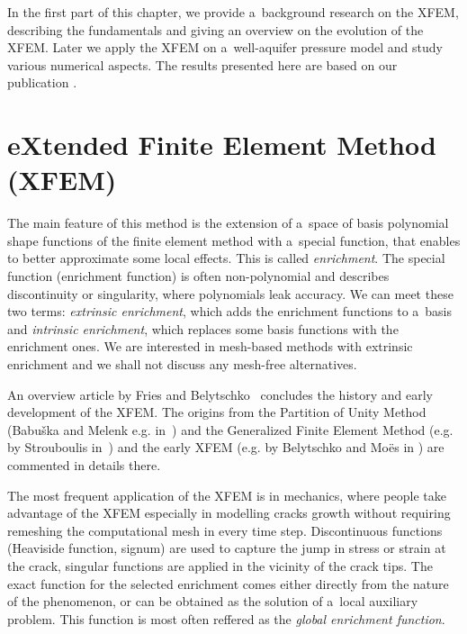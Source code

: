 

In the first part of this chapter, we provide a~background research on the XFEM,
describing the fundamentals and giving an overview on the evolution of the XFEM.
Later we apply the XFEM on a~well-aquifer pressure model and study various numerical aspects.
The results presented here are based on our publication \cite{exner_2016}.

\section{eXtended Finite Element Method (XFEM)} \label{sec:soa_xfem}

The main feature of this method is the extension of a~space of basis polynomial shape functions of the finite element
method with a~special function, that enables to better approximate some local effects. This is called \emph{enrichment}.
The special function (enrichment function) is often non-polynomial and describes discontinuity or singularity,
where polynomials leak accuracy. We can meet these two terms: \emph{extrinsic enrichment}, which adds the enrichment
functions to a~basis and \emph{intrinsic enrichment}, which replaces some basis functions with the enrichment ones.
We are interested in mesh-based methods with extrinsic enrichment and we shall not discuss any mesh-free alternatives.

An overview article by Fries and Belytschko~\cite{fries_xfem_overview_2010} concludes the history and early development
of the XFEM. The origins from the Partition of Unity Method (Babu{\v s}ka and Melenk e.g. in~\cite{babuska_partition_1997}) and
the Generalized Finite Element Method (e.g. by Strouboulis in~\cite{strouboulis_generalized_2000}) 
and the early XFEM (e.g. by Belytschko and Mo{\"e}s in \cite{moes_finite_1999}) are commented in details there.

The most frequent application of the XFEM is in mechanics, where people take advantage of the XFEM especially in
modelling cracks growth without requiring remeshing the computational mesh in every time step. 
Discontinuous functions (Heaviside function, signum) are used to capture the jump in stress or strain at the crack,
singular functions are applied in the vicinity of the crack tips. The exact function for the selected enrichment
comes either directly from the nature of the phenomenon, or can be obtained as the solution of a~local auxiliary
problem. This function is most often reffered as the \emph{global enrichment function}.

